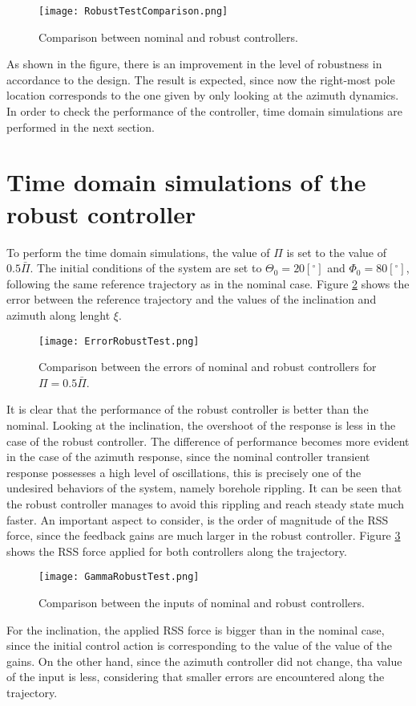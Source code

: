 \documentclass[../main.tex]{subfiles}
\begin{document}
 \begin{figure}[H]\centering
 	\texttt{[image: RobustTestComparison.png]}
 	\caption{Comparison between nominal and robust controllers.
 		\label{fig:RobustTestComparison} }
 \end{figure}

As shown in the figure, there is an improvement in the level of robustness in accordance to the design. The result is expected, since now the right-most pole location corresponds to the one given by only looking at the azimuth dynamics. In order to check the performance of the controller, time domain simulations are performed in the next section.

\section{Time domain simulations of the robust controller}

To perform the time domain simulations, the value of $\Pi$ is set to the value of $0.5 \bar{\Pi}$. The initial conditions of the system are set to $\Theta_0 = 20[^\circ]$ and $\Phi_0 = 80[^\circ]$, following the same reference trajectory as in the nominal case. Figure \ref{fig:ErrorRobustTest} shows the error between the reference trajectory and the values of the inclination and azimuth along lenght $\xi$.

 \begin{figure}[H]\centering
 	\texttt{[image: ErrorRobustTest.png]}
 	\caption{Comparison between the errors of nominal and robust controllers for $\Pi = 0.5\bar{\Pi}$.
 		\label{fig:ErrorRobustTest} }
 \end{figure}
 
 It is clear that the performance of the robust controller is better than the nominal. Looking at the inclination, the overshoot of the response is less in the case of the robust controller. The difference of performance becomes more evident in the case of the azimuth response, since the nominal controller transient response possesses a high level of oscillations, this is precisely one of the undesired behaviors of the system, namely borehole rippling. It can be seen that the robust controller manages to avoid this rippling and reach steady state much faster. An important aspect to consider, is the order of magnitude of the RSS force, since the feedback gains are much larger in the robust controller. Figure \ref{fig:GammaRobustTest} shows the RSS force applied for both controllers along the trajectory.
 
 
  \begin{figure}[H]\centering
  	\texttt{[image: GammaRobustTest.png]}
  	\caption{Comparison between the inputs of nominal and robust controllers.
  		\label{fig:GammaRobustTest} }
  \end{figure}
  
For the inclination, the applied RSS force is bigger than in the nominal case, since the initial control action is corresponding to the value of the value of the gains. On the other hand, since the azimuth controller did not change, tha value of the input is less, considering that smaller errors are encountered along the trajectory.
\end{document}
